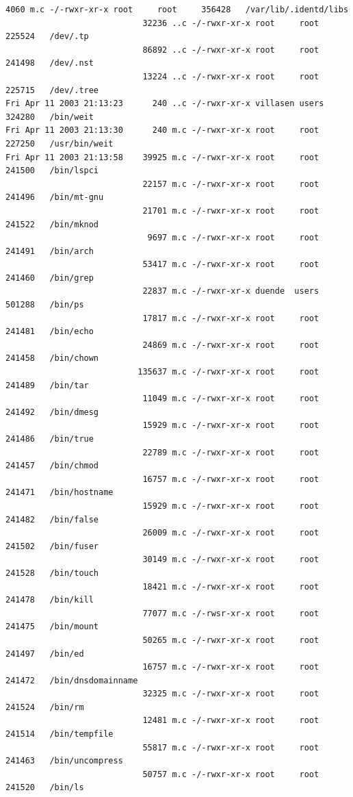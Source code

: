 {\begin{lstlisting}[style=terminal]
                             4060 m.c -/-rwxr-xr-x root     root     356428   /var/lib/.identd/libs
                            32236 ..c -/-rwxr-xr-x root     root     225524   /dev/.tp
                            86892 ..c -/-rwxr-xr-x root     root     241498   /dev/.nst
                            13224 ..c -/-rwxr-xr-x root     root     225715   /dev/.tree
Fri Apr 11 2003 21:13:23      240 ..c -/-rwxr-xr-x villasen users    324280   /bin/weit
Fri Apr 11 2003 21:13:30      240 m.c -/-rwxr-xr-x root     root     227250   /usr/bin/weit
Fri Apr 11 2003 21:13:58    39925 m.c -/-rwxr-xr-x root     root     241500   /bin/lspci
                            22157 m.c -/-rwxr-xr-x root     root     241496   /bin/mt-gnu
                            21701 m.c -/-rwxr-xr-x root     root     241522   /bin/mknod
                             9697 m.c -/-rwxr-xr-x root     root     241491   /bin/arch
                            53417 m.c -/-rwxr-xr-x root     root     241460   /bin/grep
                            22837 m.c -/-rwxr-xr-x duende  users    501288   /bin/ps
                            17817 m.c -/-rwxr-xr-x root     root     241481   /bin/echo
                            24869 m.c -/-rwxr-xr-x root     root     241458   /bin/chown
                           135637 m.c -/-rwxr-xr-x root     root     241489   /bin/tar
                            11049 m.c -/-rwxr-xr-x root     root     241492   /bin/dmesg
                            15929 m.c -/-rwxr-xr-x root     root     241486   /bin/true
                            22789 m.c -/-rwxr-xr-x root     root     241457   /bin/chmod
                            16757 m.c -/-rwxr-xr-x root     root     241471   /bin/hostname
                            15929 m.c -/-rwxr-xr-x root     root     241482   /bin/false
                            26009 m.c -/-rwxr-xr-x root     root     241502   /bin/fuser
                            30149 m.c -/-rwxr-xr-x root     root     241528   /bin/touch
                            18421 m.c -/-rwxr-xr-x root     root     241478   /bin/kill
                            77077 m.c -/-rwsr-xr-x root     root     241475   /bin/mount
                            50265 m.c -/-rwxr-xr-x root     root     241497   /bin/ed
                            16757 m.c -/-rwxr-xr-x root     root     241472   /bin/dnsdomainname
                            32325 m.c -/-rwxr-xr-x root     root     241524   /bin/rm
                            12481 m.c -/-rwxr-xr-x root     root     241514   /bin/tempfile
                            55817 m.c -/-rwxr-xr-x root     root     241463   /bin/uncompress
                            50757 m.c -/-rwxr-xr-x root     root     241520   /bin/ls

\end{lstlisting}}
